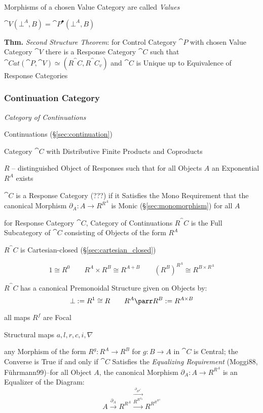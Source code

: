 Morphisms of a chosen Value Category are called \emph{Values}

$\cat{V}(\bot^A,B) = \cat{P}^\bullet(\bot^A,B)$

\textbf{Thm.} \emph{Second Structure Theorem}: for Control Category
$\cat{P}$ with chosen Value Category $\cat{V}$ there is a Response
Category $\cat{C}$ such that $\cat{Cat}(\cat{P},\cat{V}) \simeq
(R^\cat{C},R^\cat{C}_v)$ and $\cat{C}$ is Unique up to Equivalence of
Response Categories %



\subsubsection{Continuation Category}\label{sec:continuation_category}

\emph{Category of Continuations}

Continuations (\S\ref{sec:continuation})

Category $\cat{C}$ with Distributive Finite Products and Coproducts

$R$ -- distinguished Object of Responses such that for all Objects $A$
an Exponential $R^A$ exists

$\cat{C}$ is a Response Category (???) if it Satisfies the Mono
Requirement that the canonical Morphism $\partial_A: A \rightarrow
R^{R^A}$ is Monic (\S\ref{sec:monomorphism}) for all $A$

for Response Category $\cat{C}$, Category of Continuations $R^\cat{C}$
is the Full Subcategory of $\cat{C}$ consisting of Objects of the form
$R^A$

$R^\cat{C}$ is Cartesian-closed (\S\ref{sec:cartesian_closed})

\[
  1 \cong R^0 \quad\quad R^A \times R^B \cong R^{A+B} \quad\quad
  (R^B)^{R^A} \cong R^{B \times R^A}
\]

$R^\cat{C}$ has a canonical Premonoidal Structure given on Objects by:
\[
  \bot := R^1 \cong R \quad\quad R^A \parr R^B := R^{A \times B}
\]

all maps $R^f$ are Focal

Structural maps $a,l,r,c,i,\nabla$

any Morphism of the form $R^g : R^A \rightarrow R^B$ for $g : B
\rightarrow A$ in $\cat{C}$ is Central; the Converse is True if and
only if $\cat{C}$ Satisfies the \emph{Equalizing Requirement}
(Moggi88, F\"uhrmann99)--for all Object $A$, the canonical Morphism
$\partial_A : A \rightarrow R^{R^A}$ is an Equalizer of the Diagram:
\[
  A \xrightarrow{\partial_A} R^{R^A}
    \stackrel{\xrightarrow{\partial_{R^{R^A}}}}
    {\xrightarrow{R^{R^{\partial_A}}}}
  R^{R^{R^{R^A}}}
\]


